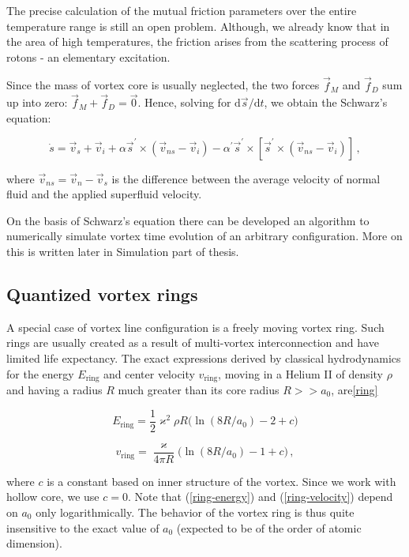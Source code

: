 The precise calculation of the mutual friction parameters over the entire temperature range is still an open problem. Although, we already know that in the area of high temperatures, the friction arises from the scattering process of rotons - an elementary excitation.

Since the mass of vortex core is usually neglected, the two forces $\vec{f}_M$ and $\vec{f}_D$ sum up into zero: $\vec{f}_M + \vec{f}_D = \vec{0}$. Hence, solving for $\text{d}\vec{s} / \text{d} t$, we obtain the Schwarz's equation:

\begin{equation}
\dot{s} = \vec{v}_s + \vec{v}_i
+ \alpha\vec{s}^{\prime} \times (\vec{v}_{ns} - \vec{v}_i)
- \alpha^{\prime}\vec{s}^{\prime} \times [\vec{s}^{\prime} \times (\vec{v}_{ns} - \vec{v}_i)]\,,
\end{equation}

where $\vec{v}_{ns} = \vec{v}_n - \vec{v}_s$ is the difference between the average velocity of normal fluid and the applied superfluid velocity.

On the basis of Schwarz's equation there can be developed an algorithm to numerically simulate vortex time evolution of an arbitrary configuration. More on this is written later in Simulation part of thesis.

\subsection*{Quantized vortex rings}

A special case of vortex line configuration is a freely moving vortex ring. Such rings are usually created as a result of multi-vortex interconnection and have limited life expectancy. The exact expressions derived by classical hydrodynamics for the energy $E_{\text{ring}}$ and center velocity $v_{\text{ring}}$, moving in a Helium II of density $\rho$ and having a radius $R$ much greater than its core radius $R >> a_0$, are\ref{ring}

\begin{equation}
E_{\text{ring}} = \frac{1}{2}\varkappa^2 \rho R \Big(\ln(8R/a_0) - 2 + c\Big)
\label{ring-energy}
\end{equation}

\begin{equation}
v_{\text{ring}} = \frac{\varkappa}{4\pi R} \Big(\ln(8R/a_0) - 1 + c\Big)\,,
\label{ring-velocity}
\end{equation}

where $c$ is a constant based on inner structure of the vortex. Since we work with hollow core, we use
$c = 0$. Note that (\ref{ring-energy}) and (\ref{ring-velocity}) depend on $a_0$ only logarithmically.
The behavior of the vortex ring is thus quite insensitive to the exact value of $a_0$ (expected to be of the order of atomic dimension).

